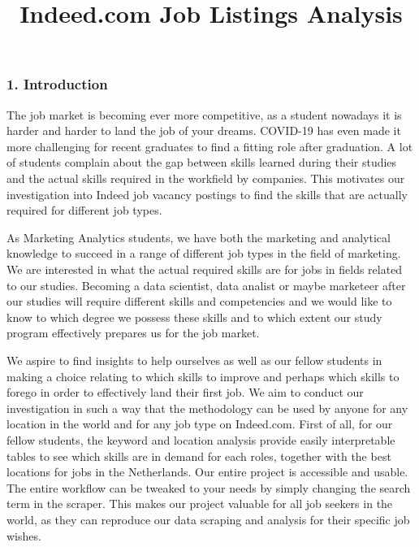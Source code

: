\documentclass[
]{article}
\title{Indeed.com Job Listings Analysis}
\author{}
\date{\vspace{-2.5em}}
\begin{document}
\maketitle

\hypertarget{section}{%
\subsubsection{}\label{section}}

\hypertarget{introduction}{%
\subsubsection{1. Introduction}\label{introduction}}

The job market is becoming ever more competitive, as a student nowadays
it is harder and harder to land the job of your dreams. COVID-19 has
even made it more challenging for recent graduates to find a fitting
role after graduation. A lot of students complain about the gap between
skills learned during their studies and the actual skills required in
the workfield by companies. This motivates our investigation into Indeed
job vacancy postings to find the skills that are actually required for
different job types.

As Marketing Analytics students, we have both the marketing and
analytical knowledge to succeed in a range of different job types in the
field of marketing. We are interested in what the actual required skills
are for jobs in fields related to our studies. Becoming a data
scientist, data analist or maybe marketeer after our studies will
require different skills and competencies and we would like to know to
which degree we possess these skills and to which extent our study
program effectively prepares us for the job market.

We aspire to find insights to help ourselves as well as our fellow
students in making a choice relating to which skills to improve and
perhaps which skills to forego in order to effectively land their first
job. We aim to conduct our investigation in such a way that the
methodology can be used by anyone for any location in the world and for
any job type on Indeed.com. First of all, for our fellow students, the
keyword and location analysis provide easily interpretable tables to see
which skills are in demand for each roles, together with the best
locations for jobs in the Netherlands. Our entire project is accessible
and usable. The entire workflow can be tweaked to your needs by simply
changing the search term in the scraper. This makes our project valuable
for all job seekers in the world, as they can reproduce our data
scraping and analysis for their specific job wishes.
\end{document}
